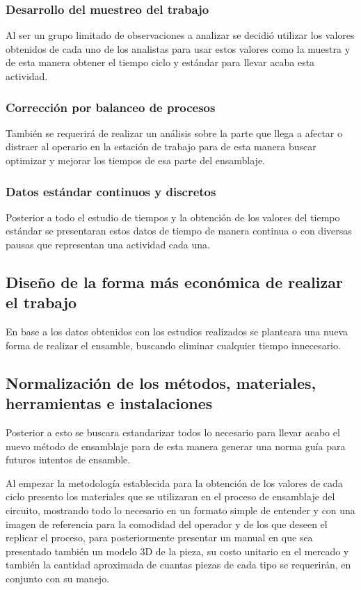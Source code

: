 \subsubsection{Desarrollo del muestreo del trabajo}
Al ser un grupo limitado de observaciones a analizar se decidió utilizar los valores obtenidos de cada uno de los analistas para usar estos valores como la muestra y de esta manera obtener el tiempo ciclo y estándar para llevar acaba esta actividad.

\subsubsection{Corrección por balanceo de procesos}
También se requerirá de realizar un análisis sobre la parte que llega a afectar o distraer al operario en la estación de trabajo para de esta manera buscar optimizar y mejorar los tiempos de esa parte del ensamblaje.

\subsubsection{Datos estándar continuos y discretos}
Posterior a todo el estudio de tiempos y la obtención de los valores del tiempo estándar se presentaran estos datos de tiempo de manera continua o con diversas pausas que representan una actividad cada una.

\subsection{Diseño de la forma más económica de realizar el trabajo}
     En base a los datos obtenidos con los estudios realizados se planteara una nueva forma de realizar el ensamble, buscando eliminar cualquier tiempo innecesario.
        
\subsection{Normalización de los métodos, materiales, herramientas e instalaciones}
Posterior a esto se buscara estandarizar todos lo necesario para llevar acabo el nuevo método de ensamblaje para de esta manera generar una norma guía para futuros intentos de ensamble.

        Al empezar la metodología establecida para la obtención de los valores de cada ciclo presento los materiales que se utilizaran en el proceso de ensamblaje del circuito, mostrando todo lo necesario en un formato simple de entender y con una imagen de referencia para la comodidad del operador y de los que deseen el replicar el proceso, para posteriormente presentar un manual en que sea presentado también un modelo 3D de la pieza, su costo unitario en el mercado y también la cantidad aproximada de cuantas piezas de cada tipo se requerirán, en conjunto con su manejo.
    
